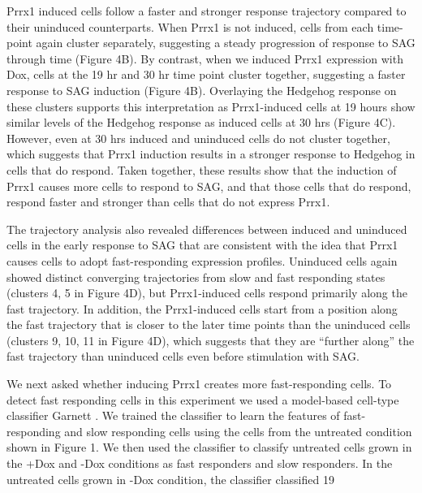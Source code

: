 Prrx1 induced cells follow a faster and stronger response trajectory compared to their uninduced counterparts. When Prrx1 is not induced, cells from each time-point again cluster separately, suggesting a steady progression of response to SAG through time (Figure 4B). By contrast, when we induced Prrx1 expression with Dox, cells at the 19 hr and 30 hr time point cluster together, suggesting a faster response to SAG induction (Figure 4B). Overlaying the Hedgehog response on these clusters supports this interpretation as Prrx1-induced cells at 19 hours show similar levels of the Hedgehog response as induced cells at 30 hrs (Figure 4C). However, even at 30 hrs induced and uninduced cells do not cluster together, which suggests that Prrx1 induction results in a stronger response to Hedgehog in cells that do respond. Taken together, these results show that the induction of Prrx1 causes more cells to respond to SAG, and that those cells that do respond, respond faster and stronger than cells that do not express Prrx1.

The trajectory analysis also revealed differences between induced and uninduced cells in the early response to SAG that are consistent with the idea that Prrx1 causes cells to adopt fast-responding expression profiles. Uninduced cells again showed distinct converging trajectories from slow and fast responding states (clusters 4, 5 in Figure 4D), but Prrx1-induced cells respond primarily along the fast trajectory. In addition, the Prrx1-induced cells start from a position along the fast trajectory that is closer to the later time points than the uninduced cells (clusters 9, 10, 11 in Figure 4D), which suggests that they are “further along” the fast trajectory than uninduced cells even before stimulation with SAG. 

We next asked whether inducing Prrx1 creates more fast-responding cells. To detect fast responding cells in this experiment we used a model-based cell-type classifier Garnett \cite{Pliner2019-vn}. We trained the classifier to learn the features of fast-responding and slow responding cells using the cells from the untreated condition shown in Figure 1. We then used the classifier to classify untreated cells grown in the +Dox and -Dox conditions as fast responders and slow responders. In the untreated cells grown in -Dox condition, the classifier classified 19%

